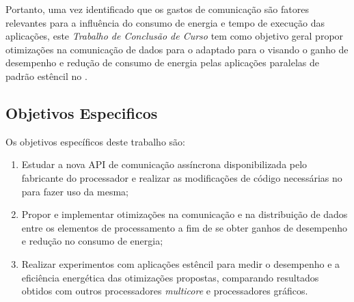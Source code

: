  Portanto, uma vez identificado que os gastos de comunicação são fatores relevantes para a influência do consumo de energia e tempo de execução das aplicações, este \textit{Trabalho de Conclusão de Curso} tem como objetivo geral propor otimizações na comunicação de dados para o \fw \pskel adaptado para o \mppa visando o ganho de desempenho e redução de consumo de energia pelas aplicações paralelas de padrão estêncil no \mppa.

\subsection{Objetivos Especificos}
\label{subsec:objetivos-específicos}

Os objetivos específicos deste trabalho são: 

\begin{enumerate}
\item Estudar a nova API de comunicação assíncrona disponibilizada pelo fabricante do processador e realizar as modificações de código necessárias no \pskel para fazer uso da mesma;
\item Propor e implementar otimizações na comunicação e na distribuição de dados entre os elementos de processamento a fim de se obter ganhos de desempenho e redução no consumo de energia;
\item Realizar experimentos com aplicações estêncil para medir o desempenho e a eficiência energética das otimizações propostas, comparando resultados obtidos com outros processadores \textit{multicore} e processadores gráficos.
\end{enumerate}